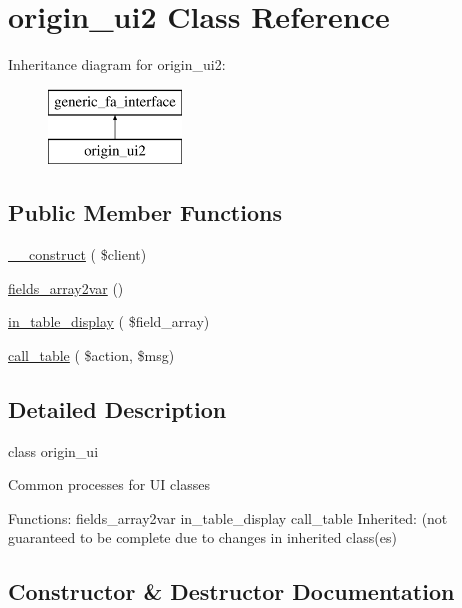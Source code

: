 \hypertarget{classorigin__ui2}{}\section{origin\+\_\+ui2 Class Reference}
\label{classorigin__ui2}
Inheritance diagram for origin\+\_\+ui2\+:\begin{figure}[H]
\begin{center}
\leavevmode
\includegraphics[height=2.000000cm]{d1/db2/classorigin__ui2}
\end{center}
\end{figure}
\subsection*{Public Member Functions}
\begin{DoxyCompactItemize}
\item 
\hyperlink{classorigin__ui2_a503ff6b0a877a4c85fb08f75b81b630e}{\+\_\+\+\_\+construct} ( \$client)
\item 
\hyperlink{classorigin__ui2_ac79b126fb01d3f54d2507c860564655d}{fields\+\_\+array2var} ()
\item 
\hyperlink{classorigin__ui2_a59694769d976755cce9b17e83780bacf}{in\+\_\+table\+\_\+display} ( \$field\+\_\+array)
\item 
\hyperlink{classorigin__ui2_a5bd82705d8ecde76f63e77920b8f8e89}{call\+\_\+table} ( \$action, \$msg)
\end{DoxyCompactItemize}


\subsection{Detailed Description}
class origin\+\_\+ui

Common processes for UI classes

Functions\+: fields\+\_\+array2var in\+\_\+table\+\_\+display call\+\_\+table Inherited\+: (not guaranteed to be complete due to changes in inherited class(es) 

\subsection{Constructor \& Destructor Documentation}
\hypertarget{classorigin__ui2_a503ff6b0a877a4c85fb08f75b81b630e}{}\label{classorigin__ui2_a503ff6b0a877a4c85fb08f75b81b630e} 
